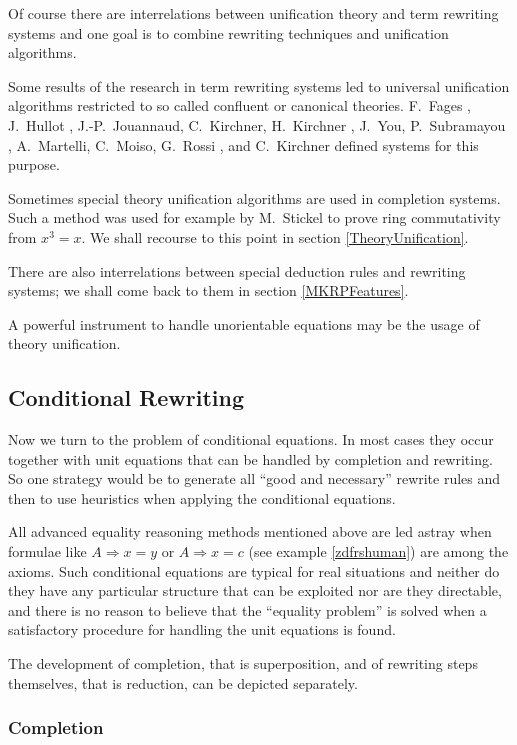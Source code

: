 Of course there are interrelations between unification
theory and term rewriting systems and one goal is 
to combine rewriting techniques and unification algorithms.

Some results of the research in term
rewriting systems led to universal unification algorithms
restricted to so called confluent or canonical theories.
F.\ Fages \cite{Fages83},
J.\ Hullot \cite{Hullot80}, J.-P.\ Jouannaud, C.\ Kirchner, H.\ Kirchner
\cite{JoKiKi83}, J.\ You, P.\ Subramayou \cite{YoSu86}, A.\ Martelli, C.\ Moiso,
G.\ Rossi \cite{MaMoRo86}, and C.\ Kirchner \cite{Kirchner85} defined
systems for this purpose.


Sometimes special theory unification algorithms
are used in completion systems.
Such a method was used for example by M.\ Stickel \cite{Stickel85}
to prove ring commutativity from $x^3=x$. We shall recourse to this point
in section \ref{TheoryUnification}.

There are also interrelations
between special deduction rules and rewriting systems; we shall come back
to them in section \ref{MKRPFeatures}.

A powerful instrument to handle unorientable equations may be the
usage of theory unification.

\subsection{Conditional Rewriting}
\label{ConditionalRewriting}
Now we turn to the problem of conditional equations. In most cases they
occur together with unit equations that can be handled by completion and
rewriting. So one strategy would be to generate all ``good and necessary''
rewrite rules and then to use heuristics when applying the conditional
equations.

All advanced equality 
reasoning methods mentioned above are led
astray when formulae like $A \Rightarrow x=y$ or $A \Rightarrow x=c$ (see 
example \ref{zdfrshuman}) are
among the axioms. Such conditional equations are typical for real
situations and neither do they
have any particular structure that can be exploited 
nor are they directable, and there is no reason to 
believe that the ``equality problem'' is solved 
when a satisfactory procedure for handling the unit equations is 
found. 

The development of completion, that is superposition, and of rewriting
steps themselves, that is reduction, can be depicted separately.

\subsubsection{Completion}


